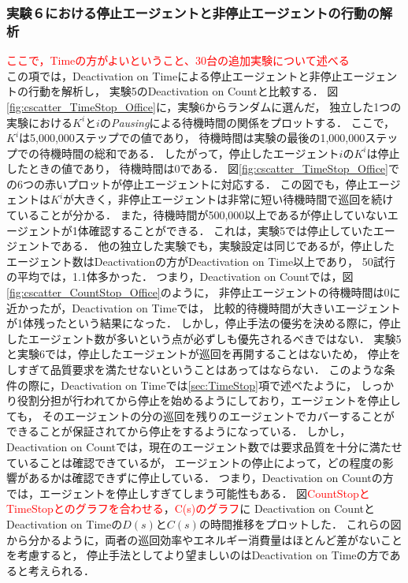 \documentclass[12pt,a4j,twoside]{jarticle}
\def\red#1{\textcolor{red}{#1}}
\begin{document}
  \subsubsection{実験６における停止エージェントと非停止エージェントの行動の解析}\label{sec:ex6Analsis}
  \red{ここで，Timeの方がよいということ、30台の追加実験について述べる}\\
  この項では，Deactivation on Timeによる停止エージェントと非停止エージェントの行動を解析し，
  実験5のDeactivation on Countと比較する．
  図\ref{fig:cscatter_TimeStop_Office}に，実験6からランダムに選んだ，
  独立した1つの実験における$K^i$と$i$の{\em Pausing}による待機時間の関係をプロットする．
  ここで，$K^i$は5,000,000ステップでの値であり，
  待機時間は実験の最後の1,000,000ステップでの待機時間の総和である．
  したがって，停止したエージェント$i$の$K^i$は停止したときの値であり，
  待機時間は0である．
  図\ref{fig:cscatter_TimeStop_Office}での6つの赤いプロットが停止エージェントに対応する．
  この図でも，停止エージェントは$K^i$が大きく，非停止エージェントは非常に短い待機時間で巡回を続けていることが分かる．
  また，待機時間が500,000以上であるが停止していないエージェントが1体確認することができる．
  これは，実験5では停止していたエージェントである．
  他の独立した実験でも，実験設定は同じであるが，停止したエージェント数はDeactivationの方がDeactivation on Time以上であり，
  50試行の平均では，1.1体多かった．
  つまり，Deactivation on Countでは，図\ref{fig:cscatter_CountStop_Office}のように，
  非停止エージェントの待機時間は0に近かったが，Deactivation on Timeでは，
  比較的待機時間が大きいエージェントが1体残ったという結果になった．
  しかし，停止手法の優劣を決める際に，停止したエージェント数が多いという点が必ずしも優先されるべきではない．
  実験5と実験6では，停止したエージェントが巡回を再開することはないため，
  停止をしすぎて品質要求を満たせないということはあってはならない．
  このような条件の際に，Deactivation on Timeでは\ref{sec:TimeStop}項で述べたように，
  しっかり役割分担が行われてから停止を始めるようにしており，エージェントを停止しても，
  そのエージェントの分の巡回を残りのエージェントでカバーすることができることが保証されてから停止をするようになっている．
  しかし，Deactivation on Countでは，現在のエージェント数では要求品質を十分に満たせていることは確認できているが，
  エージェントの停止によって，どの程度の影響があるかは確認できずに停止している．
  つまり，Deactivation on Countの方では，エージェントを停止しすぎてしまう可能性もある．
  図\red{CountStopとTimeStopとのグラフを合わせる}，\red{C(s)のグラフ}に
  Deactivation on CountとDeactivation on Timeの$D(s)$と$C(s)$の時間推移をプロットした．
  これらの図から分かるように，両者の巡回効率やエネルギー消費量はほとんど差がないことを考慮すると，
  停止手法としてより望ましいのはDeactivation on Timeの方であると考えられる．
  \par
\end{document}
